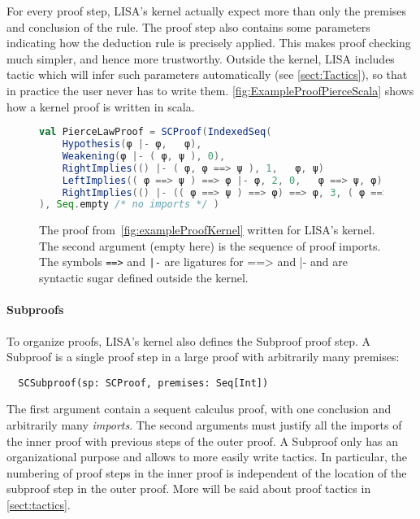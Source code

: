 For every proof step, LISA's kernel actually expect more than only the premises and conclusion of the rule. The proof step also contains some parameters indicating how the deduction rule is precisely applied. This makes proof checking much simpler, and hence more trustworthy. Outside the kernel, LISA includes tactic which will infer such parameters automatically (see \autoref{sect:Tactics}), so that in practice the user never has to write them.
\autoref{fig:ExampleProofPierceScala} shows how a kernel proof is written in scala.

\begin{figure}[ht]
  \centering
    \begin{lstlisting}[language=scala, showspaces=true]
val PierceLawProof = SCProof(IndexedSeq(
    Hypothesis(φ |- φ,   φ),
    Weakening(φ |- ( φ, ψ ), 0),
    RightImplies(() |- ( φ, φ ==> ψ ), 1,   φ, ψ)
    LeftImplies(( φ ==> ψ ) ==> φ |- φ, 2, 0,   φ ==> ψ, φ),
    RightImplies(() |- (( φ ==> ψ ) ==> φ) ==> φ, 3, ( φ ==> ψ ) ==> φ, φ)
), Seq.empty /* no imports */ )
    \end{lstlisting}
    \caption{The proof from~\autoref{fig:exampleProofKernel} written for LISA's kernel. The second argument (empty here) is the sequence of proof imports. The symbols \lstinline{==>} and \lstinline{|-} are ligatures for ==> and |- and are syntactic sugar defined outside the kernel.}
    \label{fig:ExampleProofPierceScala}
\end{figure}

\paragraph*{Subproofs}
To organize proofs, LISA's kernel also defines the Subproof proof step. A Subproof is a single proof step in a large proof with arbitrarily many premises:
\begin{lstlisting}
  SCSubproof(sp: SCProof, premises: Seq[Int])
\end{lstlisting}
The first argument contain a sequent calculus proof, with one conclusion and arbitrarily many \textit{imports}. The second arguments must justify all the imports of the inner proof with previous steps of the outer proof.
A Subproof only has an organizational purpose and allows to more easily write tactics. In particular, the numbering of proof steps  in the inner proof is independent of the location of the subproof step in the  outer proof. More will be said about proof tactics in \autoref{sect:tactics}.



